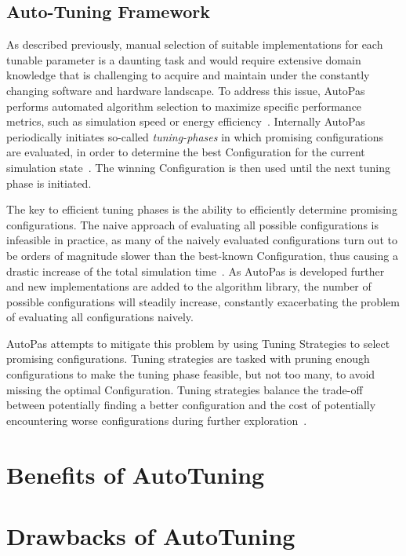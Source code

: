\documentclass[conference]{IEEEtran}
\begin{document}
\subsection{Auto-Tuning Framework}

As described previously, manual selection of suitable implementations for each tunable parameter is a daunting task and would require extensive domain knowledge that is challenging to acquire and maintain under the constantly changing software and hardware landscape. To address this issue, AutoPas performs automated algorithm selection to maximize specific performance metrics, such as simulation speed or energy efficiency~\cite{Gratl2022AutoPas}. Internally AutoPas periodically initiates so-called \textit{tuning-phases} in which promising configurations are evaluated, in order to determine the best Configuration for the current simulation state~\cite{Gratl2019AutoPas}. The winning Configuration is then used until the next tuning phase is initiated.

The key to efficient tuning phases is the ability to efficiently determine promising configurations. The naive approach of evaluating all possible configurations is infeasible in practice, as many of the naively evaluated configurations turn out to be orders of magnitude slower than the best-known Configuration, thus causing a drastic increase of the total simulation time~\cite{endreport.pdf}\cite{Manuel_Lerchner_Thesis.pdf}.
As AutoPas is developed further and new implementations are added to the algorithm library, the number of possible configurations will steadily increase, constantly exacerbating the problem of evaluating all configurations naively.

AutoPas attempts to mitigate this problem by using Tuning Strategies to select promising configurations. Tuning strategies are tasked with pruning enough configurations to make the tuning phase feasible, but not too many, to avoid missing the optimal Configuration.
Tuning strategies balance the trade-off between potentially finding a better configuration and the cost of potentially encountering worse configurations during further exploration~\cite{Newcome2023Poster}.



\section{Benefits of AutoTuning}

\section{Drawbacks of AutoTuning}
\end{document}
